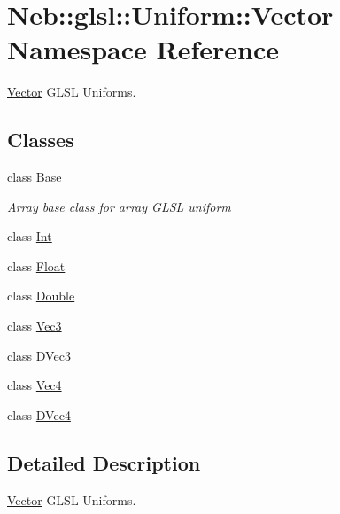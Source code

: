 \hypertarget{namespaceNeb_1_1glsl_1_1Uniform_1_1Vector}{\section{Neb\-:\-:glsl\-:\-:Uniform\-:\-:Vector Namespace Reference}
\label{namespaceNeb_1_1glsl_1_1Uniform_1_1Vector}
}


\hyperlink{namespaceNeb_1_1glsl_1_1Uniform_1_1Vector}{Vector} G\-L\-S\-L Uniforms.  


\subsection*{Classes}
\begin{DoxyCompactItemize}
\item 
class \hyperlink{classNeb_1_1glsl_1_1Uniform_1_1Vector_1_1Base}{Base}
\begin{DoxyCompactList}\small\item\em Array base class for array G\-L\-S\-L uniform \end{DoxyCompactList}\item 
class \hyperlink{classNeb_1_1glsl_1_1Uniform_1_1Vector_1_1Int}{Int}
\item 
class \hyperlink{classNeb_1_1glsl_1_1Uniform_1_1Vector_1_1Float}{Float}
\item 
class \hyperlink{classNeb_1_1glsl_1_1Uniform_1_1Vector_1_1Double}{Double}
\item 
class \hyperlink{classNeb_1_1glsl_1_1Uniform_1_1Vector_1_1Vec3}{Vec3}
\item 
class \hyperlink{classNeb_1_1glsl_1_1Uniform_1_1Vector_1_1DVec3}{D\-Vec3}
\item 
class \hyperlink{classNeb_1_1glsl_1_1Uniform_1_1Vector_1_1Vec4}{Vec4}
\item 
class \hyperlink{classNeb_1_1glsl_1_1Uniform_1_1Vector_1_1DVec4}{D\-Vec4}
\end{DoxyCompactItemize}


\subsection{Detailed Description}
\hyperlink{namespaceNeb_1_1glsl_1_1Uniform_1_1Vector}{Vector} G\-L\-S\-L Uniforms. 